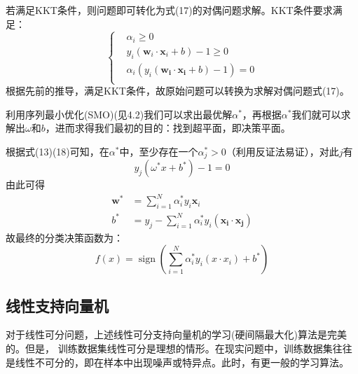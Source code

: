 \documentclass{progartcn}
\begin{document}
若满足KKT条件，则问题即可转化为式(17)的对偶问题求解。KKT条件要求满足：
\begin{equation}
	\left\{
	\begin{aligned}
		&\alpha_{i} \geq 0 \\
		&y_{i}\left(\boldsymbol{w}_{i} \cdot \boldsymbol{x}_{i}+b\right)-1 \geq 0 \\	&\alpha_{i}\left(y_{i}\left(\boldsymbol{w}_{\boldsymbol{i}} \cdot \boldsymbol{x}_{\boldsymbol{i}}+b\right)-1\right)=0 \\
		\end{aligned}
	\right.
\end{equation}
根据先前的推导，满足KKT条件，故原始问题可以转换为求解对偶问题式(17)。

利用序列最小优化(SMO)(见4.2)我们可以求出最优解$\alpha^*$，再根据$\alpha^*$我们就可以求解出$\omega$和$b$，进而求得我们最初的目的：找到超平面，即决策平面。

根据式(13)(18)可知，在$\alpha^*$中，至少存在一个$\alpha_j^* > 0$（利用反证法易证），对此$j$有
\begin{equation}
	y_j(\omega^*x+b^*)-1 = 0
\end{equation}
由此可得
\begin{equation}
	\begin{aligned}
		\boldsymbol{w}^{*}&=\sum_{i=1}^{N} \alpha_{i}^{*} y_{i} \boldsymbol{x}_{i} \\
		b^{*}&=y_{j}-\sum_{i=1}^{N} \alpha_{i}^{*} y_{i}\left(\boldsymbol{x}_{\boldsymbol{i}} \cdot \boldsymbol{x}_{\boldsymbol{j}}\right)
	\end{aligned}
\end{equation}
故最终的分类决策函数为：
\begin{equation}
	f(x)=\operatorname{sign}\left(\sum_{i=1}^{N} \alpha_{i}^{*} y_{i}\left(x \cdot x_{i}\right)+b^{*}\right)
\end{equation}
\subsection{线性支持向量机}
对于线性可分问题，上述线性可分支持向量机的学习(硬间隔最大化)算法是完美的。但是， 训练数据集线性可分是理想的情形。在现实问题中，训练数据集往往是线性不可分的，即在样本中出现噪声或特异点。此时，有更一般的学习算法。
\end{document}
